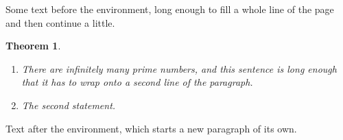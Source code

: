 \documentclass{article}
\newtheorem{theorem}{Theorem}
\begin{document}
Some text before the environment, long enough to fill a whole line of the page and then continue a little.
\begin{theorem}
\begin{enumerate}
\item There are infinitely many prime numbers, and this sentence is long enough that it has to wrap onto a second line of the paragraph.
\item The second statement.
\end{enumerate}
\end{theorem}
Text after the environment, which starts a new paragraph of its own.
\end{document}
